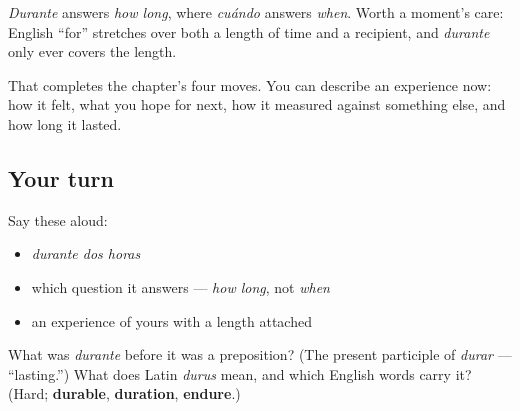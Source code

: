 \begin{grammarlens}[title={What you've built}]
\emph{Durante} answers \emph{how long}, where \emph{cuándo} answers \emph{when}. Worth a moment's care: English \textquotedblleft{}for\textquotedblright{} stretches over both a length of time and a recipient, and \emph{durante} only ever covers the length.

That completes the chapter's four moves. You can describe an experience now: how it felt, what you hope for next, how it measured against something else, and how long it lasted.
\end{grammarlens}

\subsection*{Your turn}
Say these aloud:

\begin{itemize}
\raggedright
  \item \emph{durante dos horas}
  \item which question it answers — \emph{how long}, not \emph{when}
  \item an experience of yours with a length attached
\end{itemize}

\begin{tcolorbox}[breakable,colback=teal!4,colframe=teal!35!black,title={Before you move on}]
What was \emph{durante} before it was a preposition? (The present participle of \emph{durar} — \textquotedblleft{}lasting.\textquotedblright{}) What does Latin \emph{durus} mean, and which English words carry it? (Hard; \textbf{durable}, \textbf{duration}, \textbf{endure}.)
\end{tcolorbox}
